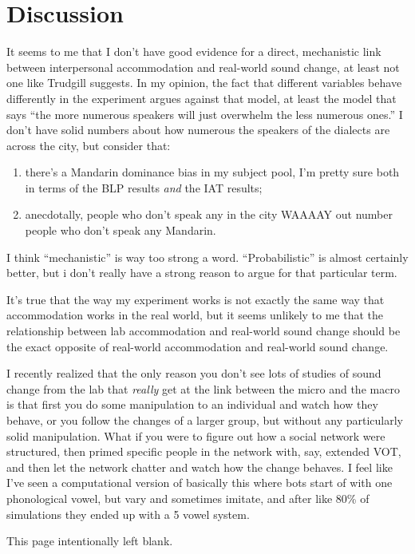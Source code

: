 \chapter{Discussion}
\label{discussionchapter}

It seems to me that I don't have good evidence for a direct, mechanistic link between interpersonal accommodation and real-world sound change, at least not one like Trudgill suggests. In my opinion, the fact that different variables behave differently in the experiment argues against that model, at least the model that says ``the more numerous speakers will just overwhelm the less numerous ones.'' I don't have solid numbers about how numerous the speakers of the dialects are across the city, but consider that:

\begin{enumerate}
    \item there's a Mandarin dominance bias in my subject pool, I'm pretty sure both in terms of the BLP results \textit{and} the IAT results;
    \item anecdotally, people who don't speak any \ND{} in the city WAAAAY out number people who don't speak any Mandarin.
\end{enumerate}

I think ``mechanistic'' is way too strong a word. ``Probabilistic'' is almost certainly better, but i don't really have a strong reason to argue for that particular term.

It's true that the way my experiment works is not exactly the same way that accommodation works in the real world, but it seems unlikely to me that the relationship between lab accommodation and real-world sound change should be the exact opposite of real-world accommodation and real-world sound change.

I recently realized that the only reason you don't see lots of studies of sound change from the lab that \emph{really} get at the link between the micro and the macro is that first you do some manipulation to an individual and watch how they behave, or you follow the changes of a larger group, but without any particularly solid manipulation. What if you were to figure out how a social network were structured, then primed specific people in the network with, say, extended VOT, and then let the network chatter and watch how the change behaves. I feel like I've seen a computational version of basically this where bots start of with one phonological vowel, but vary and sometimes imitate, and after like 80\% of simulations they ended up with a 5 vowel system.

\pagebreak

This page intentionally left blank.